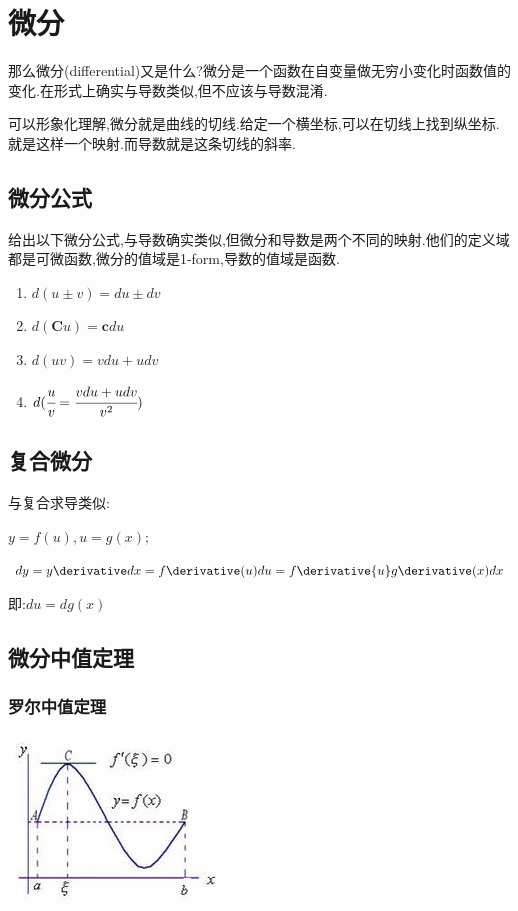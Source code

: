 {{{  }%

 }%

\section{微分}{
那么微分(differential)又是什么?微分是一个函数在自变量做无穷小变化时函数值的变化.在形式上确实与导数类似,但不应该与导数混淆.

可以形象化理解,微分就是曲线的切线.给定一个横坐标,可以在切线上找到纵坐标.就是这样一个映射.而导数就是这条切线的斜率.

\subsection{微分公式}{
  给出以下微分公式,与导数确实类似,但微分和导数是两个不同的映射.他们的定义域都是可微函数,微分的值域是1-form,导数的值域是函数.
  \begin{enumerate}
    \item $d(u \pm v) = du \pm dv$
    \item $d(\mathbf{C}u) = \mathbf{c}du$
    \item $d(uv) = vdu + udv$
    \item $d(\cfrac{u}{v} = \cfrac{vdu + udv}{v^2})$
  \end{enumerate}
}%

\subsection{复合微分}{
  与复合求导类似:

  $y = f(u), u = g(x);$

  $dy = y\derivative dx = f\derivative(u)du = f\derivative{u}g\derivative(x)dx$

  即:$du = dg(x)$
}%

\subsection{微分中值定理}{

\subsubsection{罗尔中值定理}{
  \begin{center}
    \includegraphics{resources/Rolle's_mean_value_theorem.jpg}
  \end{center}

}}}}
